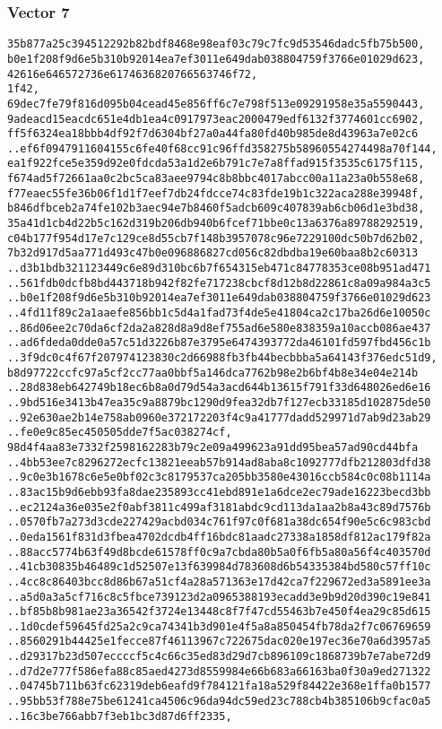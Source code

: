 \documentclass[
]{article}
\begin{document}
\hypertarget{vector-7-2}{%
\subsubsection{Vector 7}\label{vector-7-2}}

\begin{verbatim}
35b877a25c394512292b82bdf8468e98eaf03c79c7fc9d53546dadc5fb75b500,
b0e1f208f9d6e5b310b92014ea7ef3011e649dab038804759f3766e01029d623,
42616e646572736e6174636820766563746f72,
1f42,
69dec7fe79f816d095b04cead45e856ff6c7e798f513e09291958e35a5590443,
9adeacd15eacdc651e4db1ea4c0917973eac2000479edf6132f3774601cc6902,
ff5f6324ea18bbb4df92f7d6304bf27a0a44fa80fd40b985de8d43963a7e02c6
..ef6f0947911604155c6fe40f68cc91c96ffd358275b58960554274498a70f144,
ea1f922fce5e359d92e0fdcda53a1d2e6b791c7e7a8ffad915f3535c6175f115,
f674ad5f72661aa0c2bc5ca83aee9794c8b8bbc4017abcc00a11a23a0b558e68,
f77eaec55fe36b06f1d1f7eef7db24fdcce74c83fde19b1c322aca288e39948f,
b846dfbceb2a74fe102b3aec94e7b8460f5adcb609c407839ab6cb06d1e3bd38,
35a41d1cb4d22b5c162d319b206db940b6fcef71bbe0c13a6376a89788292519,
c04b177f954d17e7c129ce8d55cb7f148b3957078c96e7229100dc50b7d62b02,
7b32d917d5aa771d493c47b0e096886827cd056c82dbdba19e60baa8b2c60313
..d3b1bdb321123449c6e89d310bc6b7f654315eb471c84778353ce08b951ad471
..561fdb0dcfb8bd443718b942f82fe717238cbcf8d12b8d22861c8a09a984a3c5
..b0e1f208f9d6e5b310b92014ea7ef3011e649dab038804759f3766e01029d623
..4fd11f89c2a1aaefe856bb1c5d4a1fad73f4de5e41804ca2c17ba26d6e10050c
..86d06ee2c70da6cf2da2a828d8a9d8ef755ad6e580e838359a10accb086ae437
..ad6fdeda0dde0a57c51d3226b87e3795e6474393772da46101fd597fbd456c1b
..3f9dc0c4f67f207974123830c2d66988fb3fb44becbbba5a64143f376edc51d9,
b8d97722ccfc97a5cf2cc77aa0bbf5a146dca7762b98e2b6bf4b8e34e04e214b
..28d838eb642749b18ec6b8a0d79d54a3acd644b13615f791f33d648026ed6e16
..9bd516e3413b47ea35c9a8879bc1290d9fea32db7f127ecb33185d102875de50
..92e630ae2b14e758ab0960e372172203f4c9a41777dadd529971d7ab9d23ab29
..fe0e9c85ec450505dde7f5ac038274cf,
98d4f4aa83e7332f2598162283b79c2e09a499623a91dd95bea57ad90cd44bfa
..4bb53ee7c8296272ecfc13821eeab57b914ad8aba8c1092777dfb212803dfd38
..9c0e3b1678c6e5e0bf02c3c8179537ca205bb3580e43016ccb584c0c08b1114a
..83ac15b9d6ebb93fa8dae235893cc41ebd891e1a6dce2ec79ade16223becd3bb
..ec2124a36e035e2f0abf3811c499af3181abdc9cd113da1aa2b8a43c89d7576b
..0570fb7a273d3cde227429acbd034c761f97c0f681a38dc654f90e5c6c983cbd
..0eda1561f831d3fbea4702dcdb4ff16bdc81aadc27338a1858df812ac179f82a
..88acc5774b63f49d8bcde61578ff0c9a7cbda80b5a0f6fb5a80a56f4c403570d
..41cb30835b46489c1d52507e13f639984d783608d6b54335384bd580c57ff10c
..4cc8c86403bcc8d86b67a51cf4a28a571363e17d42ca7f229672ed3a5891ee3a
..a5d0a3a5cf716c8c5fbce739123d2a0965388193ecadd3e9b9d20d390c19e841
..bf85b8b981ae23a36542f3724e13448c8f7f47cd55463b7e450f4ea29c85d615
..1d0cdef59645fd25a2c9ca74341b3d901e4f5a8a850454fb78da2f7c06769659
..8560291b44425e1fecce87f46113967c722675dac020e197ec36e70a6d3957a5
..d29317b23d507eccccf5c4c66c35ed83d29d7cb896109c1868739b7e7abe72d9
..d7d2e777f586efa88c85aed4273d8559984e66b683a66163ba0f30a9ed271322
..04745b711b63fc62319deb6eafd9f784121fa18a529f84422e368e1ffa0b1577
..95bb53f788e75be61241ca4506c96da94dc59ed23c788cb4b385106b9cfac0a5
..16c3be766abb7f3eb1bc3d87d6ff2335,
\end{verbatim}
\end{document}
